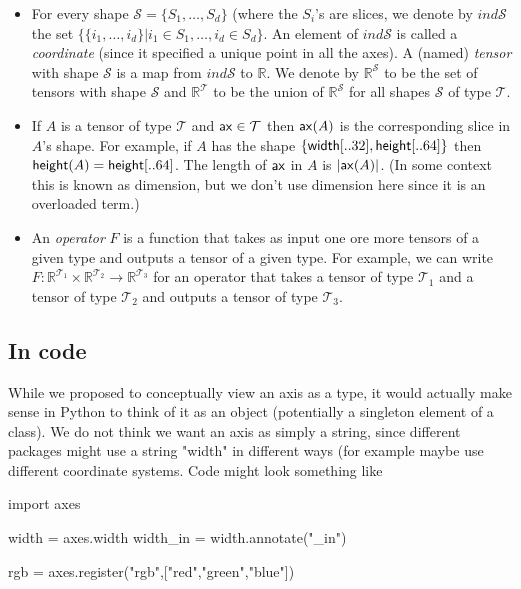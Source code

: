 \documentclass{article}
\begin{document}
\begin{itemize}
  \item For every shape $\mathcal{S} = \{ S_1,\ldots, S_d \}$ (where the $S_i$'s are slices, we denote by $ind \mathcal{S}$ the set $\{ \{ i_1,\ldots, i_d \} | i_1 \in S_1, \ldots, i_d \in S_d \}$. An element of $ind \mathcal{S}$ is called a \emph{coordinate} (since it specified a unique point in all the axes). A (named) \emph{tensor} with shape $\mathcal{S}$ is a map from $ind \mathcal{S}$ to $\mathbb{R}$. We denote by $\mathbb{R}^{\mathcal{S}}$ to be the set of tensors with shape $\mathcal{S}$ and $\mathbb{R}^{\mathcal{T}}$ to be the union of $\mathbb{R}^{\mathcal{S}}$ for all shapes $\mathcal{S}$ of type $\mathcal{T}$.
  
  \item If $A$ is a tensor of type $\mathcal{T}$ and $\mathsf{ax} \in \mathcal{T}$ then $\mathsf{ax}(A)$ is the corresponding slice in $A$'s shape. For example, if $A$ has the shape $\{ \mathsf{width}[..32] , \mathsf{height}[..64] \}$ then $\mathsf{height}(A) = \mathsf{height}[..64]$. The length of $\mathsf{ax}$ in $A$ is $|\mathsf{ax}(A)|$. (In some context this is known as dimension, but we don't use dimension here since it is an overloaded term.) 
  
  \item An \emph{operator}  $F$ is a function that takes as input one ore more tensors of a given type and outputs a tensor of a given type. For example, we can write $F:\mathbb{R}^{\mathcal{T}_1} \times \mathbb{R}^{\mathcal{T}_2} \rightarrow \mathbb{R}^{\mathcal{T}_3}$ for an operator that takes a tensor of type $\mathcal{T}_1$ and a tensor of type $\mathcal{T}_2$ and outputs a tensor of type $\mathcal{T}_3$. 

  

\end{itemize}


\subsection{In code} 

While we proposed to conceptually view an axis as a type, it would actually make sense in Python to think of it as an object (potentially a singleton element of a class). 
We do not think we want an axis as simply a string, since different packages might use a string "width" in different ways (for example maybe use different coordinate systems. Code might look something like

\begin{python}
import axes

width = axes.width
width_in = width.annotate("_in")

rgb = axes.register("rgb",["red","green","blue"])
\end{python}
\end{document}
